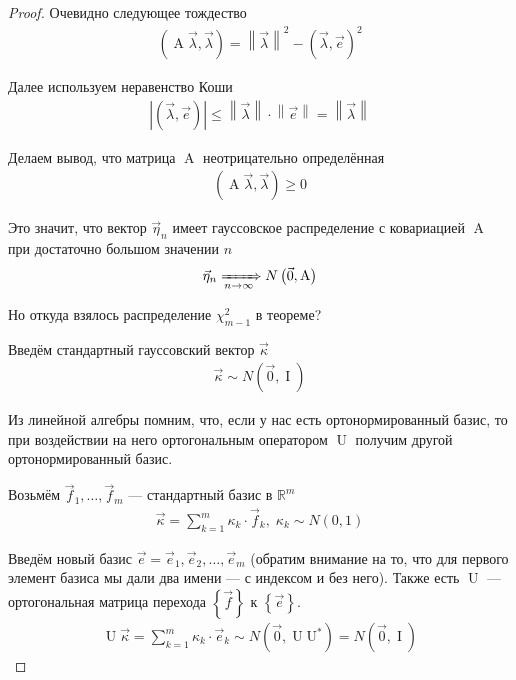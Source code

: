 \begin{proof}
    Очевидно следующее тождество
    \begin{align*}
        \left( \operatorname{A} \vec{\lambda}, \vec{\lambda} \right)
        = \left\| \vec{\lambda} \right\|^2
            - \left( \vec{\lambda}, \vec{e} \right)^2
    \end{align*}

    Далее используем неравенство Коши
    \begin{align*}
        \left| \left( \vec{\lambda}, \vec{e} \right) \right|
        \le \left\| \vec{\lambda} \right\| \cdot \left\| \vec{e} \right\|
        = \left\| \vec{\lambda} \right\|
    \end{align*}

    Делаем вывод, что матрица $\operatorname{A}$ неотрицательно определённая
    \begin{align*}
        \left( \operatorname{A} \vec{\lambda}, \vec{\lambda} \right) \ge 0
    \end{align*}

    Это значит, что вектор $\vec{\eta}_n$ имеет гауссовское распределение с
    ковариацией $\operatorname{A}$ при достаточно большом значении $n$
    \begin{align*}
        \vec{\eta}_n \xRightarrow[n\to\infty]{} N\left( \vec{0}, \operatorname{A} \right)
    \end{align*}

    Но откуда взялось распределение $\chi_{m-1}^2$ в теореме?

    Введём стандартный гауссовский вектор $\vec{\kappa}$
    \begin{align*}
        \vec{\kappa} \sim N\left( \vec{0}, \operatorname{I} \right)
    \end{align*}

    Из линейной алгебры помним, что, если у нас есть ортонормированный базис,
    то при воздействии на него ортогональным оператором $\operatorname{U}$
    получим другой ортонормированный базис.

    Возьмём $\vec{f}_1, \dots, \vec{f}_m$ --- стандартный базис в
    $\mathbb{R}^m$
    \begin{align*}
        \vec{\kappa} = \sum_{k=1}^{m} \kappa_k \cdot \vec{f}_k,\;
        \kappa_k \sim N\left( 0, 1 \right)
    \end{align*}

    Введём новый базис $\vec{e} = \vec{e}_1, \vec{e}_2, \dots, \vec{e}_m$
    (обратим внимание на то, что для первого элемент базиса мы дали два имени
    --- с индексом и без него). Также есть $\operatorname{U}$ --- ортогональная
    матрица перехода $\left\{ \vec{f} \right\}$ к $\left\{ \vec{e} \right\}$.
    \begin{align*}
        \operatorname{U} \vec{\kappa}
        = \sum_{k=1}^{m} \hat{\kappa}_k \cdot \vec{e}_k
        \sim N\left( \vec{0}, \operatorname{U} \operatorname{U^*} \right)
        = N\left( \vec{0}, \operatorname{I} \right)
    \end{align*}


\end{proof}
